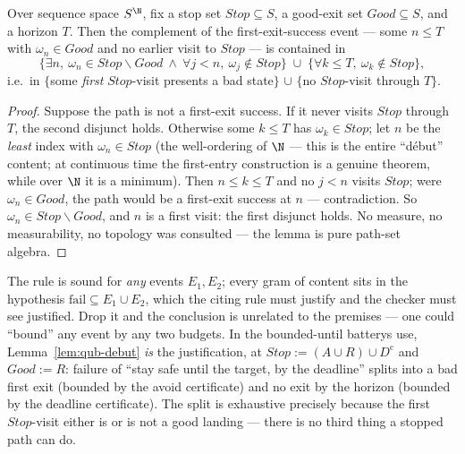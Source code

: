 \begin{blemma}
\label{lem:qub-debut}
Over sequence space $S^{\N}$, fix a stop set
$\mathit{Stop} \subseteq S$, a good-exit set $\mathit{Good} \subseteq S$,
and a horizon $T$. Then the complement of the first-exit-success event
--- some $n \le T$ with $\omega_n \in \mathit{Good}$ and no earlier
visit to $\mathit{Stop}$ --- is contained in
\[
\bigl\{\exists n,\ \omega_n \in \mathit{Stop} \smallsetminus \mathit{Good}
\ \wedge\ \forall j < n,\ \omega_j \notin \mathit{Stop}\bigr\}
\;\cup\;
\bigl\{\forall k \le T,\ \omega_k \notin \mathit{Stop}\bigr\},
\]
i.e.\ in $\{$some \emph{first} $\mathit{Stop}$-visit presents a bad
state$\}$ $\cup$ $\{$no $\mathit{Stop}$-visit through $T\}$.
\end{blemma}
\begin{proof}
Suppose the path is not a first-exit success. If it never visits
$\mathit{Stop}$ through $T$, the second disjunct holds. Otherwise some
$k \le T$ has $\omega_k \in \mathit{Stop}$; let $n$ be the \emph{least}
index with $\omega_n \in \mathit{Stop}$ (the well-ordering of $\N$ ---
this is the entire ``d\'ebut'' content; at continuous time the
first-entry construction is a genuine theorem, while over $\N$ it is a
minimum). Then $n \le k \le T$ and no $j < n$ visits $\mathit{Stop}$;
were $\omega_n \in \mathit{Good}$, the path would be a first-exit
success at $n$ --- contradiction. So $\omega_n \in \mathit{Stop}
\smallsetminus \mathit{Good}$, and $n$ is a first visit: the first
disjunct holds. No measure, no measurability, no topology was consulted
--- the lemma is pure path-set algebra.
\end{proof}

\begin{bremark}\label{rem:qub-content}
The rule is sound for \emph{any} events $E_1, E_2$; every gram of
content sits in the hypothesis
$\mathrm{fail} \subseteq E_1 \cup E_2$, which the citing rule must
justify and the checker must see justified. Drop it and the conclusion
is unrelated to the premises --- one could ``bound'' any event by any
two budgets. In the bounded-until battery\textquotesingle s use,
Lemma~\ref{lem:qub-debut} \emph{is} the justification, at
$\mathit{Stop} := (A \cup R) \cup D^{\mathrm{c}}$ and
$\mathit{Good} := R$: failure of ``stay safe until the target, by the
deadline'' splits into a bad first exit (bounded by the avoid
certificate) and no exit by the horizon (bounded by the deadline
certificate). The split is exhaustive precisely because the first
$\mathit{Stop}$-visit either is or is not a good landing --- there is no
third thing a stopped path can do.
\end{bremark}

